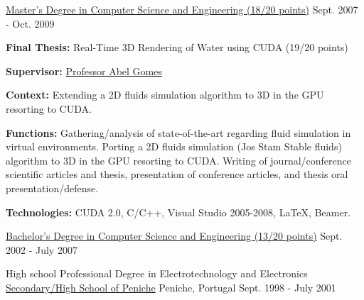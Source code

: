 \begin{cventries}
  \cventry
    {\href{https://www.ubi.pt/en/course/804}{Master's Degree in Computer Science and Engineering (18/20 points)}} %
    {} %
    {} %
    {Sept. 2007 - Oct. 2009} %
    {
      \begin{cvitems} %
        \item {\textbf{Final Thesis:} Real-Time 3D Rendering of Water using CUDA (19/20 points)}
        \item {\textbf{Supervisor:} \href{http://www.di.ubi.pt/~agomes/}{Professor Abel Gomes}}
		\item {\textbf{Context:} Extending a 2D fluids simulation algorithm to 3D in the GPU resorting to CUDA. }
		\item {\textbf{Functions:} Gathering/analysis of state-of-the-art regarding fluid simulation in virtual environments. Porting a 2D fluids simulation (Jos Stam Stable fluids) algorithm to 3D in the GPU resorting to CUDA. Writing of journal/conference scientific articles and thesis, presentation of conference articles, and thesis oral presentation/defense.}
        \item {\textbf{Technologies:} CUDA 2.0, C/C++, Visual Studio 2005-2008, LaTeX, Beamer.} %
      \end{cvitems}
    }

  \cventry
    {\href{https://www.ubi.pt/en/course/42}{Bachelor's Degree in Computer Science and Engineering (13/20 points)}} %
    {} %
    {} %
    {Sept. 2002 - July 2007} %
    {
    }
  \vspace{-0.5cm}
    
  \cventry
    {High school Professional Degree in Electrotechnology and Electronics} %
    {\href{http://espeniche.pt/sitesp/index.php}{Secondary/High School of Peniche}} %
    {Peniche, Portugal} %
    {Sept. 1998 - July 2001} %
    {
    }

\end{cventries}
